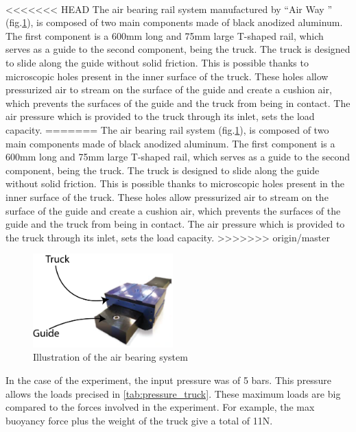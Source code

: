 \paragraph{}
<<<<<<< HEAD
The air bearing rail system manufactured by "`Air Way \texttrademark"' (fig.\ref{fig:pic_frictionless}), is composed of two main components made of black anodized aluminum. The first component is a 600mm long and 75mm large T-shaped rail, which serves as a guide to the second component, being the truck. The truck is designed to slide along the guide without solid friction. This is possible thanks to microscopic holes present in the inner surface of the truck. These holes allow pressurized air to stream on the surface of the guide and create a cushion air, which prevents the surfaces of the guide and the truck from being in contact. The air pressure which is provided to the truck through its inlet, sets the load capacity.
=======
The air bearing rail system (fig.\ref{fig:pic_frictionless}), is composed of two main components made of black anodized aluminum. The first component is a 600mm long and 75mm large T-shaped rail, which serves as a guide to the second component, being the truck. The truck is designed to slide along the guide without solid friction. This is possible thanks to microscopic holes present in the inner surface of the truck. These holes allow pressurized air to stream on the surface of the guide and create a cushion air, which prevents the surfaces of the guide and the truck from being in contact. The air pressure which is provided to the truck through its inlet, sets the load capacity.
>>>>>>> origin/master
\begin{figure}[H] %
	\centering%
	\includegraphics[width=0.48\textwidth]{figures/Chapter_1/Airbearing.png}
	\caption{Illustration of the air bearing system}
	\label{fig:pic_frictionless}
\end{figure}
In the case of the experiment, the input pressure was of 5 bars. This pressure allows the loads precised in \ref{tab:pressure_truck}. These maximum loads are big compared to the forces involved in the experiment. For example, the max buoyancy force plus the weight of the truck give a total of 11N.\\
